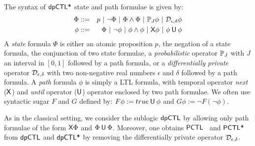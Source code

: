 
The syntax of $\textsf{dpCTL*}$ state and path formulae is given by:
\begin{eqnarray*}
  \Phi & ::= & p \ |\ \neg \Phi \ |\ \Phi \wedge \Phi \ |\
               \PJ{J} \phi \ |\ \dpriv{\epsilon}{\delta} \phi\\
  \phi & ::= & \Phi \ |\ \neg\phi  \ |\  \phi\wedge\phi  \ |\  \X \phi \ |\ \phi \until \phi
\end{eqnarray*}
A \emph{state} formula $\Phi$ is either  an atomic proposition
$p$, the negation of a state formula, the conjunction of two state
formulae, a \emph{probabilistic} operator $\mathbb{P}_{J}$ with $J$
an interval in $[0, 1]$ followed by a path formula, or a
\emph{differentially private} operator $\mathcal{D}_{{\epsilon}, {\delta}}$
 with two non-negative real numbers $\epsilon$ and $\delta$ followed
 by a path formula. A
\emph{path} formula $\phi$ is simply a LTL formula, with temporal operator \emph{next}  ($\mathsf{X}$)
and  \emph{until} operator
($\mathbin{\mathsf{U}}$) operator enclosed by two path formulae.
We often use syntactic sugar $F$ and $G$ defined by: $F \phi:= true \mathbin{\mathsf{U}} \phi$ and $G\phi :=\neg F (\neg\phi)$.

As in the classical setting, we consider the sublogic $\textsf{dpCTL}$ by allowing only path formulae of the form $\mathsf{X}\Phi$ and $\Phi\mathbin{\mathsf{U}}\Phi$.
Moreover, one obtains $\textsf{PCTL}$~\cite{HanssonJ94} and $\textsf{PCTL*}$~\cite{BiancoA95} from $\textsf{dpCTL}$ and $\textsf{dpCTL*}$
by removing the differentially private operator  $\mathcal{D}_{{\epsilon}, {\delta}}$.

